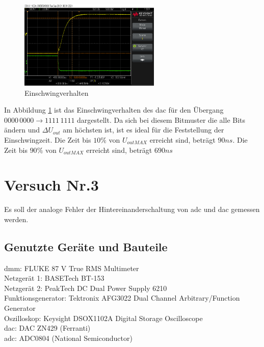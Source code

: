 \documentclass[12pt, a4paper, ngerman]{article}
\begin{document}
\begin{figure}%
  \centering
  \includegraphics[width=0.6\textwidth]{scope_34.png}
  \caption{Einschwingverhalten}
  \label{abb:einschwing1}
\end{figure}

In Abbildung \ref{abb:einschwing1} ist das Einschwingverhalten des \ac{dac} für den Übergang $0000\,0000\rightarrow 1111\,1111$
dargestellt. Da sich bei diesem Bitmuster die alle Bits ändern und $\Delta U_{out}$ am höchsten ist,
ist es ideal für die Feststellung der Einschwingzeit. Die Zeit bis $10\%$ von $U_{out MAX}$ erreicht sind,
beträgt $90ns$. Die Zeit bis $90\%$ von $U_{out MAX}$ erreicht sind,
beträgt $690ns$ %


\section{Versuch Nr.3}

Es soll der analoge Fehler der Hintereinanderschaltung von \ac{adc} und \ac{dac} gemessen werden.

\subsection{Genutzte Geräte und Bauteile}

\acl{dmm}: FLUKE 87 V True RMS Multimeter \\
Netzgerät 1: BASETech BT-153 \\
Netzgerät 2: PeakTech DC Dual Power Supply 6210 \\
Funktionsgenerator: Tektronix AFG3022 Dual Channel Arbitrary/Function Generator \\
Oszilloskop: Keysight DSOX1102A Digital Storage Oscilloscope \\
\ac{dac}: DAC ZN429 (Ferranti) \\
\ac{adc}: ADC0804 (National Semiconductor)
\end{document}

